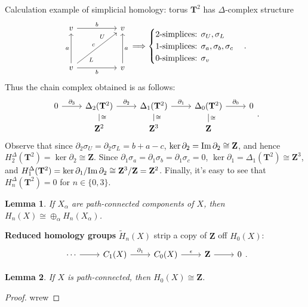 \documentclass[11pt]{article}
\theoremstyle{definition}
\theoremstyle{plain}
\newtheorem*{lemma}{Lemma}
\theoremstyle{remark}
\newcommand{\im}{\textup{Im}\,}
\newcommand{\Z}{\mathbf{Z}}
\begin{document}
Calculation example of simplicial homology: torus $\mathbf{T}^2$ has $\Delta$-complex structure
\[\begin{tikzcd}[column sep=huge,row sep=huge]
v\arrow{r}{b}&v\\
v\arrow{u}{a}\arrow[swap]{r}{b}\arrow[ur,"U" near end,"L"' near start,"c"]&v\arrow[swap]{u}{a}
\end{tikzcd}\Longrightarrow\begin{cases}
\textrm{2-simplices: }\sigma_U,\sigma_L\\
\textrm{1-simplices: }\sigma_a,\sigma_b,\sigma_c\\
\textrm{0-simplices: }\sigma_v
\end{cases}.\]
Thus the chain complex obtained is as follows:
\[\begin{tikzcd}[row sep=small]
0\arrow{r}{\partial_3}&\Delta_2(\mathbf{T}^2)\arrow[dash]{d}{\cong}\arrow{r}{\partial_2}&\Delta_1(\mathbf{T}^2)\arrow[dash]{d}{\cong}\arrow{r}{\partial_1}&\Delta_0(\mathbf{T}^2)\arrow{r}{\partial_0}\arrow[dash]{d}{\cong}&0\\
&\Z^2&\Z^3&\Z
\end{tikzcd}.\]
Observe that since $\partial_2\sigma_U=\partial_2\sigma_L=b+a-c$, $\ker\partial_2=\im\partial_2\cong\Z$, and hence
$H_2^\Delta(\mathbf{T}^2)=\ker\partial_2\cong\Z$. Since $\partial_1\sigma_a=\partial_1\sigma_b=\partial_1\sigma_c=0$, $\ker\partial_1=\Delta_1(\mathbf{T}^2)\cong\Z^3$, and $H_1^\Delta(\mathbf{T}^2)=\ker\partial_1/\im\partial_2\cong\Z^3/\Z=\Z^2$. Finally, it's easy to see that $H_n^\Delta(\mathbf{T}^2)=0$ for $n\in\{0,3\}$.

\begin{lemma}
If $X_\alpha$ are path-connected components of $X$, then $H_n(X)\cong\oplus_\alpha H_n(X_\alpha)$.
\end{lemma}

\textbf{Reduced homology groups} $\widetilde{H}_n(X)$ strip a copy of $\Z$ off $H_0(X)$:
\[\begin{tikzcd}
\cdots\arrow{r}&C_1(X)\arrow{r}{\partial_1}&C_0(X)\arrow{r}{\epsilon}&\Z\arrow[r]&0
\end{tikzcd}.\]

\begin{lemma}
If $X$ is path-connected, then $H_0(X)\cong\Z$.
\end{lemma}
\begin{proof}
wrew
\end{proof}
\end{document}

